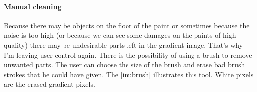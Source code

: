 \documentclass[11pt]{article}
\begin{document}
	\paragraph{Manual cleaning} Because there may be objects on the floor of the paint or sometimes because the noise is too high (or because we can see some damages on the paints of high quality) there may be undesirable parts left in the gradient image. That's why I'm leaving user control again. There is the possibility of using a brush to remove unwanted parts. The user can choose the size of the brush and erase bad brush strokes that he could have given. The \figurename \ref{im:brush} illustrates this tool. White pixels are the erased gradient pixels.
	
	\begin{figure}[h]
		\centering
\end{figure}
\end{document}
